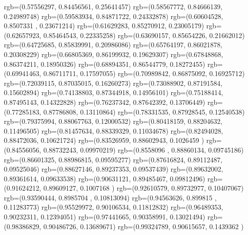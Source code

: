 {{{      rgb=(0.57556297,  0.84456561,  0.25641457)
      rgb=(0.58567772,  0.84666139,  0.24989748)
      rgb=(0.59583934,  0.84871722,  0.24332878)
      rgb=(0.60604528,  0.8507331 ,  0.23671214)
      rgb=(0.61629283,  0.85270912,  0.23005179)
      rgb=(0.62657923,  0.85464543,  0.22335258)
      rgb=(0.63690157,  0.85654226,  0.21662012)
      rgb=(0.64725685,  0.85839991,  0.20986086)
      rgb=(0.65764197,  0.86021878,  0.20308229)
      rgb=(0.66805369,  0.86199932,  0.19629307)
      rgb=(0.67848868,  0.86374211,  0.18950326)
      rgb=(0.68894351,  0.86544779,  0.18272455)
      rgb=(0.69941463,  0.86711711,  0.17597055)
      rgb=(0.70989842,  0.86875092,  0.16925712)
      rgb=(0.72039115,  0.87035015,  0.16260273)
      rgb=(0.73088902,  0.87191584,  0.15602894)
      rgb=(0.74138803,  0.87344918,  0.14956101)
      rgb=(0.75188414,  0.87495143,  0.14322828)
      rgb=(0.76237342,  0.87642392,  0.13706449)
      rgb=(0.77285183,  0.87786808,  0.13110864)
      rgb=(0.78331535,  0.87928545,  0.12540538)
      rgb=(0.79375994,  0.88067763,  0.12000532)
      rgb=(0.80418159,  0.88204632,  0.11496505)
      rgb=(0.81457634,  0.88339329,  0.11034678)
      rgb=(0.82494028,  0.88472036,  0.10621724)
      rgb=(0.83526959,  0.88602943,  0.1026459 )
      rgb=(0.84556056,  0.88732243,  0.09970219)
      rgb=(0.8558096 ,  0.88860134,  0.09745186)
      rgb=(0.86601325,  0.88986815,  0.09595277)
      rgb=(0.87616824,  0.89112487,  0.09525046)
      rgb=(0.88627146,  0.89237353,  0.09537439)
      rgb=(0.89632002,  0.89361614,  0.09633538)
      rgb=(0.90631121,  0.89485467,  0.09812496)
      rgb=(0.91624212,  0.89609127,  0.1007168 )
      rgb=(0.92610579,  0.89732977,  0.10407067)
      rgb=(0.93590444,  0.8985704 ,  0.10813094)
      rgb=(0.94563626,  0.899815  ,  0.11283773)
      rgb=(0.95529972,  0.90106534,  0.11812832)
      rgb=(0.96489353,  0.90232311,  0.12394051)
      rgb=(0.97441665,  0.90358991,  0.13021494)
      rgb=(0.98386829,  0.90486726,  0.13689671)
      rgb=(0.99324789,  0.90615657,  0.1439362 )
    }
  }
}

